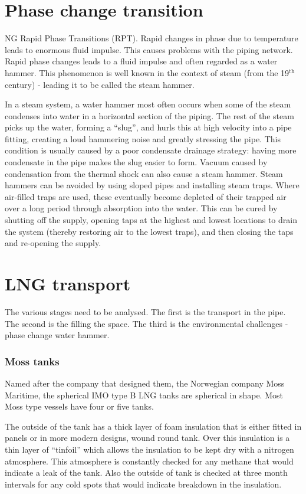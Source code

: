\section{Phase change transition}
NG Rapid Phase Transitions (RPT). Rapid changes in phase due to temperature leads to enormous fluid impulse. This causes problems with the piping network. Rapid phase changes leads to a fluid impulse and often regarded as a water hammer. This phenomenon is well known in the context of steam (from the 19$^{\textrm{th}}$ century) - leading it to be called the steam hammer.

In a steam system, a water hammer most often occurs when some of the steam condenses into water in a horizontal section of the piping. The rest of the steam picks up the water, forming a ``slug'', and hurls this at high velocity into a pipe fitting, creating a loud hammering noise and greatly stressing the pipe. This condition is usually caused by a poor condensate drainage strategy: having more condensate in the pipe makes the slug easier to form. Vacuum caused by condensation from the thermal shock can also cause a steam hammer. Steam hammers can be avoided by using sloped pipes and installing steam traps. Where air-filled traps are used, these eventually become depleted of their trapped air over a long period through absorption into the water. This can be  cured by shutting off the supply, opening taps at the highest and lowest locations to drain the system (thereby restoring air to the lowest traps), and then closing the taps and re-opening the supply. 
\section{LNG transport}
The various stages need to be analysed. The first is the transport in the pipe. The second is the filling the space. The third is the environmental challenges - phase change water hammer. 
\subsubsection{Moss tanks}
Named after the company that designed them, the Norwegian company Moss Maritime, the spherical IMO type B LNG tanks are spherical in shape. Most Moss type vessels have four or five tanks. 

The outside of the tank has a thick layer of foam insulation that is either fitted in panels or in more modern designs, wound round tank. Over this insulation is a thin layer of ``tinfoil'' which allows the insulation to be kept dry with a nitrogen atmosphere. This atmosphere is constantly checked for any methane that would indicate a leak of the tank. Also the outside of tank is checked at three month intervals for any cold spots that would indicate breakdown in the insulation.

